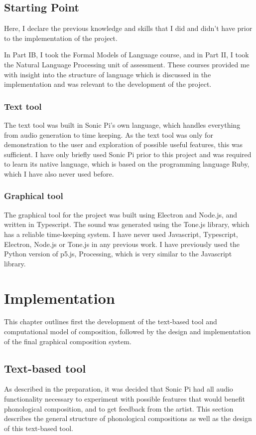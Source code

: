 \documentclass[12pt,a4paper,oneside,openright]{report}
\begin{document}
\section{Starting Point}
Here, I declare the previous knowledge and skills that I did and didn't have prior to the implementation of the project.

In Part IB, I took the Formal Models of Language course, and in Part II, I took the Natural Language Processing unit of assessment. These courses provided me with insight into the structure of language which is discussed in the implementation and was relevant to the development of the project.

\subsection{Text tool}
The text tool was built in Sonic Pi's own language, which handles everything from audio generation to time keeping. As the text tool was only for demonstration to the user and exploration of possible useful features, this was sufficient. I have only briefly used Sonic Pi prior to this project and was required to learn its native language, which is based on the programming language Ruby, which I have also never used before.

\subsection{Graphical tool}
The graphical tool for the project was built using Electron and Node.js, and written in Typescript. The sound was generated using the Tone.js library, which has a reliable time-keeping system. I have never used Javascript, Typescript, Electron, Node.js or Tone.js in any previous work. I have previously used the Python version of p5.js, Processing, which is very similar to the Javascript library.

\chapter{Implementation}
This chapter outlines first the development of the text-based tool and computational model of composition, followed by the design and implementation of the final graphical composition system.

\section{Text-based tool}
As described in the preparation, it was decided that Sonic Pi had all audio functionality necessary to experiment with possible features that would benefit phonological composition, and to get feedback from the artist. This section describes the general structure of phonological compositions as well as the design of this text-based tool.
\end{document}
